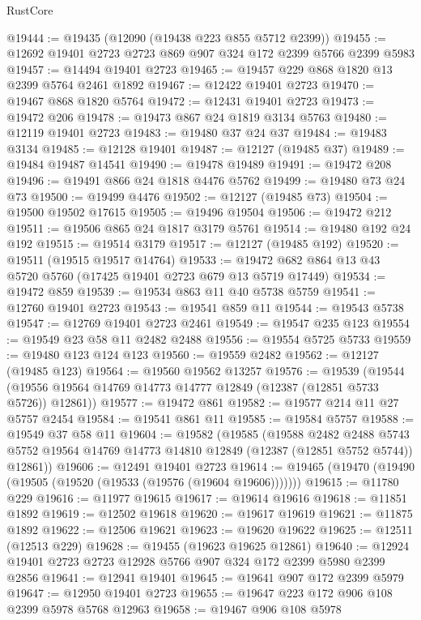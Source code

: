 \begin{lexlean}{RustCore}
\begin{coremodule}
@19444 := @19435 (@12090 (@19438 @223 @855 @5712 @2399))
@19455 := @12692 @19401 @2723 @2723 @869 @907 @324 @172 @2399 @5766 @2399 @5983
@19457 := @14494 @19401 @2723
@19465 := @19457 @229 @868 @1820 @13 @2399 @5764 @2461 @1892
@19467 := @12422 @19401 @2723
@19470 := @19467 @868 @1820 @5764
@19472 := @12431 @19401 @2723
@19473 := @19472 @206
@19478 := @19473 @867 @24 @1819 @3134 @5763
@19480 := @12119 @19401 @2723
@19483 := @19480 @37 @24 @37
@19484 := @19483 @3134
@19485 := @12128 @19401
@19487 := @12127 (@19485 @37)
@19489 := @19484 @19487 @14541
@19490 := @19478 @19489
@19491 := @19472 @208
@19496 := @19491 @866 @24 @1818 @4476 @5762
@19499 := @19480 @73 @24 @73
@19500 := @19499 @4476
@19502 := @12127 (@19485 @73)
@19504 := @19500 @19502 @17615
@19505 := @19496 @19504
@19506 := @19472 @212
@19511 := @19506 @865 @24 @1817 @3179 @5761
@19514 := @19480 @192 @24 @192
@19515 := @19514 @3179
@19517 := @12127 (@19485 @192)
@19520 := @19511 (@19515 @19517 @14764)
@19533 := @19472 @682 @864 @13 @43 @5720 @5760 (@17425 @19401 @2723 @679 @13 @5719 @17449)
@19534 := @19472 @859
@19539 := @19534 @863 @11 @40 @5738 @5759
@19541 := @12760 @19401 @2723
@19543 := @19541 @859 @11
@19544 := @19543 @5738
@19547 := @12769 @19401 @2723 @2461
@19549 := @19547 @235 @123
@19554 := @19549 @23 @58 @11 @2482 @2488
@19556 := @19554 @5725 @5733
@19559 := @19480 @123 @124 @123
@19560 := @19559 @2482
@19562 := @12127 (@19485 @123)
@19564 := @19560 @19562 @13257
@19576 := @19539
    (@19544 (@19556 @19564 @14769 @14773 @14777 @12849 (@12387 (@12851 @5733 @5726)) @12861))
@19577 := @19472 @861
@19582 := @19577 @214 @11 @27 @5757 @2454
@19584 := @19541 @861 @11
@19585 := @19584 @5757
@19588 := @19549 @37 @58 @11
@19604 := @19582
    (@19585
      (@19588
        @2482
        @2488
        @5743
        @5752
        @19564
        @14769
        @14773
        @14810
        @12849
        (@12387 (@12851 @5752 @5744))
        @12861))
@19606 := @12491 @19401 @2723
@19614 := @19465 (@19470 (@19490 (@19505 (@19520 (@19533 (@19576 (@19604 @19606)))))))
@19615 := @11780 @229
@19616 := @11977 @19615
@19617 := @19614 @19616
@19618 := @11851 @1892
@19619 := @12502 @19618
@19620 := @19617 @19619
@19621 := @11875 @1892
@19622 := @12506 @19621
@19623 := @19620 @19622
@19625 := @12511 (@12513 @229)
@19628 := @19455 (@19623 @19625 @12861)
@19640 := @12924 @19401 @2723 @2723 @12928 @5766 @907 @324 @172 @2399 @5980 @2399 @2856
@19641 := @12941 @19401
@19645 := @19641 @907 @172 @2399 @5979
@19647 := @12950 @19401 @2723
@19655 := @19647 @223 @172 @906 @108 @2399 @5978 @5768 @12963
@19658 := @19467 @906 @108 @5978

\end{coremodule}
\end{lexlean}
